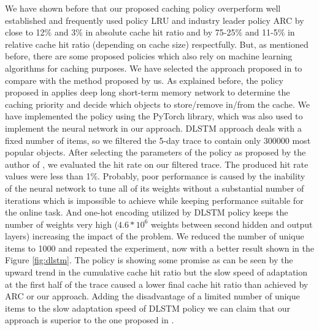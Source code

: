 We have shown before that our proposed caching policy overperform well established and frequently used policy LRU and industry leader policy ARC by close to 12\% and 3\% in absolute cache hit ratio and by 75-25\% and 11-5\% in relative cache hit ratio (depending on cache size) respectfully. But, as mentioned before, there are some proposed policies which also rely on machine learning algorithms for caching purposes. We have selected the approach proposed in \cite{23} to compare with the method proposed by us. As explained before, the policy proposed in \cite{23} applies deep long short-term memory network to determine the caching priority and decide which objects to store/remove in/from the cache. We have implemented the policy using the PyTorch library, which was also used to implement the neural network in our approach. DLSTM approach deals with a fixed number of items, so we filtered the 5-day trace to contain only $300 000$ most popular objects. After selecting the parameters of the policy as proposed by the author of \cite{23}, we evaluated the hit rate on our filtered trace. The produced hit rate values were less than 1\%. Probably, poor performance is caused by the inability of the neural network to tune all of its weights without a substantial number of iterations which is impossible to achieve while keeping performance suitable for the online task. And one-hot encoding utilized by DLSTM policy keeps the number of weights very high ($4.6 * 10^6$ weights between second hidden and output layers) increasing the impact of the problem. We reduced the number of unique items to 1000 and repeated the experiment, now with a better result shown in the Figure \ref{fig:dlstm}. The policy is showing some promise as can be seen by the upward trend in the cumulative cache hit ratio but the slow speed of adaptation at the first half of the trace caused a lower final cache hit ratio than achieved by ARC or our approach. Adding the disadvantage of a limited number of unique items to the slow adaptation speed of DLSTM policy we can claim that our approach is superior to the one proposed in \cite{23}.

